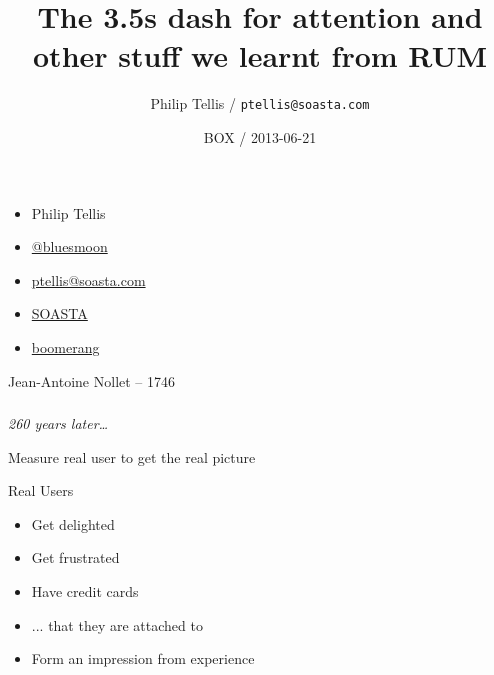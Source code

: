 \documentclass{beamer}
\author{Philip Tellis / \texttt{ptellis@soasta.com}}
\title{The 3.5s dash for attention and other stuff we learnt from RUM}
\date{BOX / 2013-06-21}
\newcommand{\innersplash}[1]{
  \begin{center}
    \Large \textrm{\textit{ #1 } }
  \end{center}
}
\newcommand{\splashslide}[2][{}]{
  \begin{frame}
  \frametitle{#1}
  \innersplash{#2}
  \end{frame}
}
\begin{document}
\begin{frame}
  \begin{itemize}
  \item Philip Tellis
  \item \href{http://twitter.com/bluesmoon}{@bluesmoon}
  \item \href{http://bluesmoon.info/}{ptellis@soasta.com}
  \item \href{http://www.soasta.com/}{SOASTA}
  \item \href{http://lognormal.github.com/boomerang/doc/}{boomerang}
  \end{itemize}
\end{frame}

\begin{frame}
  \titlepage
\end{frame}

\begin{frame}{Jean-Antoine Nollet -- 1746}
\end{frame}

\splashslide{260 years later\ldots}


\begin{frame}{Measure real user to get the real picture}
\end{frame}

\begin{frame}{Real Users}
  \begin{itemize}
    \item Get delighted
    \item Get frustrated
    \item Have credit cards
    \item ... that they are attached to
    \item Form an impression from experience
  \end{itemize}
\end{frame}
\end{document}
